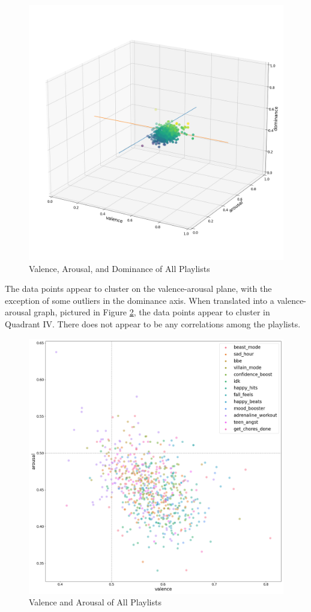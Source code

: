 \documentclass[11pt]{article}
\begin{document}
\begin{figure}[!ht]
  \includegraphics[scale=0.3]{../statics/plots/vad.png}
  \centering
  \caption{Valence, Arousal, and Dominance of All Playlists}
  \label{fig:vad_pl}
\end{figure}
The data points appear to cluster on the valence-arousal plane, with the exception of some outliers in the dominance axis. When translated into a valence-arousal graph, pictured in Figure \ref{fig:va_pl}, the data points appear to cluster in Quadrant IV. There does not appear to be any correlations among the playlists.
\begin{figure}[!ht]
  \includegraphics[scale=0.35]{../statics/plots/va_playlist_False.png}
  \centering
  \caption{Valence and Arousal of All Playlists}
  \label{fig:va_pl}
\end{figure}
\end{document}
